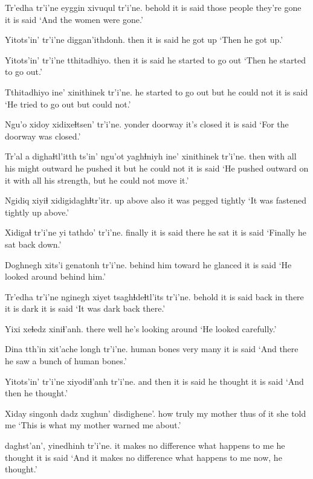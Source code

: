 \documentclass[12pt]{article}
\begin{document}
\gll Tr'edha tr'i'ne eyggin xivuqul tr'i'ne.
behold  {it is said} {those people} {they're gone} {it is said}
\glt `And the women were gone.'
\glend

\gll Yitots'in' tr'i'ne diggan'ithdonh.
then  {it is said} {he got up}
\glt `Then he got up.'
\glend

\gll Yitots'in' tr'i'ne tthitadhiyo.
then  {it is said} {he started to go out}
\glt `Then he started to go out.'
\glend

\gll Tthitadhiyo  ine' xinithinek tr'i'ne.
{he started to go out} but {he could not} {it is said}
\glt `He tried to go out but could not.'
\glend

\gll Ngu'o xidoy xidixeɬtsen' tr'i'ne.
yonder doorway {it's closed} {it is said}
\glt `For the doorway was closed.'
\glend

\gll Tr'al a {dighaɬtl'itth ts'in'} ngu'ot  yaghɬniyh ine' xinithinek tr'i'ne.
then {} {with all his might} outward {he pushed it} but {he could not} {it is said}
\glt `He pushed outward on it with all his strength, but he could not move it.'
\glend

\gll Ngidiq xiyiɬ xidigidaghɬtr'itr.
{up above} also {it was pegged tightly}
\glt `It was fastened tightly up above.'
\glend

\gll Xidigaɬ tr'i'ne yi tathdo' tr'i'ne.
finally  {it is said} there {he sat} {it is said}
\glt `Finally he sat back down.'
\glend

\gll Doghnegh xits'i genatonh tr'i'ne.
{behind him} toward {he glanced} {it is said}
\glt `He looked around behind him.'
\glend

\gll Tr'edha tr'i'ne nginegh xiyet  tsaghɬdeɬtl'its tr'i'ne.
behold  {it is said} back {in there} {it is dark} {it is said}
\glt `It was dark back there.'
\glend

\gll Yixi xeɬedz xiniɬ'anh.
there well  {he's looking around}
\glt `He looked carefully.'
\glend

\gll Dina tth'in xit'ache longh tr'i'ne.
human bones very many {it is said}
\glt `And there he saw a bunch of human bones.'
\glend

\gll Yitots'in' tr'i'ne xiyodiɬ'anh tr'i'ne.
{and then} {it is said} {he thought}  {it is said}
\glt `And then he thought.'
\glend

\gll Xiday singonh dadz xughun' disdighene'.
{how truly} {my mother} thus {of it} {she told me}
\glt `This is what my mother warned me about.'
\glend

   daghst'an', yinedhinh tr'i'ne.
{it makes no difference}  {what happens to me} {he thought} {it is said}
\glt `And it makes no difference what happens to me now, he thought.'
\glend
\end{document}

